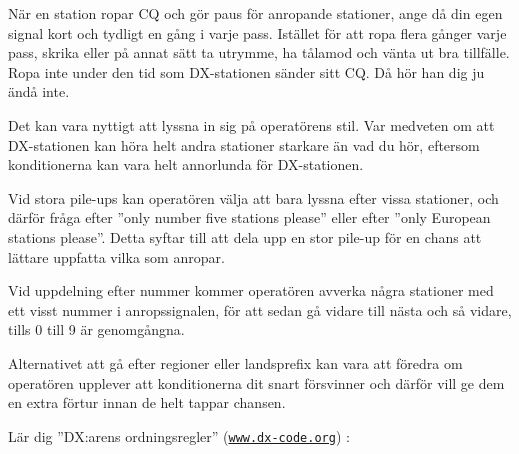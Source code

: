 När en station ropar CQ och gör paus för anropande stationer, ange då din egen
signal kort och tydligt en gång i varje pass.
Istället för att ropa flera gånger varje pass, skrika eller på annat sätt
ta utrymme, ha tålamod och vänta ut bra tillfälle.
Ropa inte under den tid som DX-stationen sänder sitt CQ. Då hör han dig ju ändå inte.

Det kan vara nyttigt att lyssna in sig på operatörens stil.
Var medveten om att DX-stationen kan höra helt andra stationer starkare än vad
du hör, eftersom konditionerna kan vara helt annorlunda för DX-stationen.

Vid stora pile-ups kan operatören välja att bara lyssna efter vissa stationer,
och därför fråga efter ''only number five stations please'' eller efter ''only
European stations please''.
Detta syftar till att dela upp en stor pile-up för en chans att lättare
uppfatta vilka som anropar.

Vid uppdelning efter nummer kommer operatören avverka några stationer med ett
visst nummer i anropssignalen, för att sedan gå vidare till nästa och så
vidare, tills 0 till 9 är genomgångna.

Alternativet att gå efter regioner eller landsprefix kan vara att föredra om
operatören upplever att konditionerna dit snart försvinner och därför vill ge
dem en extra förtur innan de helt tappar chansen.

Lär dig ''DX:arens ordningsregler'' (\href{http://www.dx-code.org/}{\texttt{www.dx-code.org}}) :

